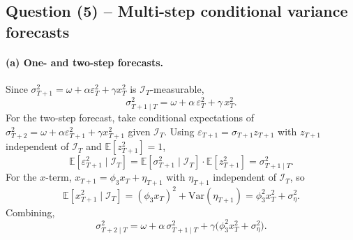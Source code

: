 \documentclass[12pt]{article}
\newcommand{\E}{\mathbb{E}}
\newcommand{\Var}{\mathrm{Var}}
\newcommand{\Info}{\mathcal{I}}
\begin{document}
\subsection*{Question (5) -- Multi-step conditional variance forecasts}\label{sec:p3-q5}

\paragraph{(a) One- and two-step forecasts.} Since $\sigma_{T+1}^2=\omega+\alpha\varepsilon_T^2+\gamma x_T^2$ is $\Info_T$-measurable,
\begin{equation}
\sigma_{T+1\mid T}^2 = \omega+\alpha\,\varepsilon_T^2+\gamma\,x_T^2.\label{eq:f1}
\end{equation}
For the two-step forecast, take conditional expectations of $\sigma_{T+2}^2=\omega+\alpha\varepsilon_{T+1}^2+\gamma x_{T+1}^2$ given $\Info_T$. Using $\varepsilon_{T+1}=\sigma_{T+1}z_{T+1}$ with $z_{T+1}$ independent of $\Info_T$ and $\E[z_{T+1}^2]=1$,
\begin{equation*}
\E[\varepsilon_{T+1}^2\mid\Info_T]
= \E[\sigma_{T+1}^2\mid\Info_T]\cdot\E[z_{T+1}^2]
= \sigma_{T+1\mid T}^2.
\end{equation*}
For the $x$-term, $x_{T+1}=\phi_3 x_T+\eta_{T+1}$ with $\eta_{T+1}$ independent of $\Info_T$, so
\begin{equation*}
\E[x_{T+1}^2\mid\Info_T] = (\phi_3 x_T)^2 + \Var(\eta_{T+1}) = \phi_3^2 x_T^2 + \sigma_\eta^2.
\end{equation*}
Combining,
\begin{equation}
\sigma_{T+2\mid T}^2
= \omega + \alpha\,\sigma_{T+1\mid T}^2 + \gamma\big(\phi_3^2 x_T^2 + \sigma_\eta^2\big).\label{eq:f2}
\end{equation}
\end{document}
